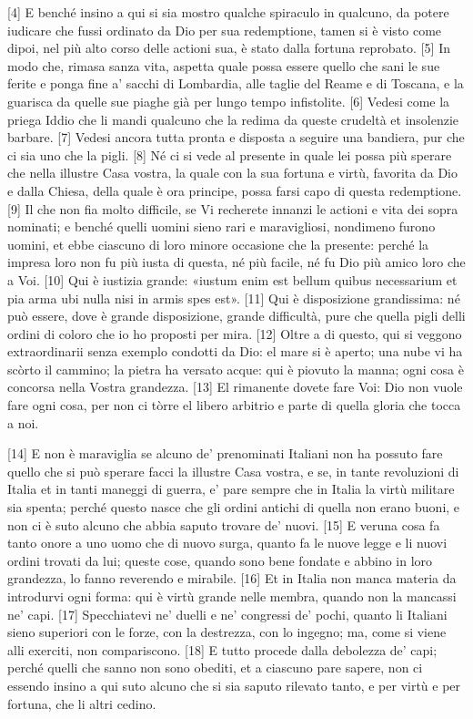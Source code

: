 {[}4{]} E benché insino a qui si sia mostro qualche spiraculo in
qualcuno, da potere iudicare che fussi ordinato da Dio per sua
redemptione, tamen si è visto come dipoi, nel più alto corso delle
actioni sua, è stato dalla fortuna reprobato. {[}5{]} In modo che,
rimasa sanza vita, aspetta quale possa essere quello che sani le sue
ferite e ponga fine a' sacchi di Lombardia, alle taglie del Reame e di
Toscana, e la guarisca da quelle sue piaghe già per lungo tempo
infistolite. {[}6{]} Vedesi come la priega Iddio che li mandi qualcuno
che la redima da queste crudeltà et insolenzie barbare. {[}7{]} Vedesi
ancora tutta pronta e disposta a seguire una bandiera, pur che ci sia
uno che la pigli. {[}8{]} Né ci si vede al presente in quale lei possa
più sperare che nella illustre Casa vostra, la quale con la sua fortuna
e virtù, favorita da Dio e dalla Chiesa, della quale è ora principe,
possa farsi capo di questa redemptione. {[}9{]} Il che non fia molto
difficile, se Vi recherete innanzi le actioni e vita dei sopra nominati;
e benché quelli uomini sieno rari e maravigliosi, nondimeno furono
uomini, et ebbe ciascuno di loro minore occasione che la presente:
perché la impresa loro non fu più iusta di questa, né più facile, né fu
Dio più amico loro che a Voi. {[}10{]} Qui è iustizia grande: «iustum
enim est bellum quibus necessarium et pia arma ubi nulla nisi in armis
spes est». {[}11{]} Qui è disposizione grandissima: né può essere, dove
è grande disposizione, grande difficultà, pure che quella pigli delli
ordini di coloro che io ho proposti per mira. {[}12{]} Oltre a di
questo, qui si veggono extraordinarii senza exemplo condotti da Dio: el
mare si è aperto; una nube vi ha scòrto il cammino; la pietra ha versato
acque: qui è piovuto la manna; ogni cosa è concorsa nella Vostra
grandezza. {[}13{]} El rimanente dovete fare Voi: Dio non vuole fare
ogni cosa, per non ci tòrre el libero arbitrio e parte di quella gloria
che tocca a noi.

{[}14{]} E non è maraviglia se alcuno de' prenominati Italiani non ha
possuto fare quello che si può sperare facci la illustre Casa vostra, e
se, in tante revoluzioni di Italia et in tanti maneggi di guerra, e'
pare sempre che in Italia la virtù militare sia spenta; perché questo
nasce che gli ordini antichi di quella non erano buoni, e non ci è suto
alcuno che abbia saputo trovare de' nuovi. {[}15{]} E veruna cosa fa
tanto onore a uno uomo che di nuovo surga, quanto fa le nuove legge e li
nuovi ordini trovati da lui; queste cose, quando sono bene fondate e
abbino in loro grandezza, lo fanno reverendo e mirabile. {[}16{]} Et in
Italia non manca materia da introdurvi ogni forma: qui è virtù grande
nelle membra, quando non la mancassi ne' capi. {[}17{]} Specchiatevi ne'
duelli e ne' congressi de' pochi, quanto li Italiani sieno superiori con
le forze, con la destrezza, con lo ingegno; ma, come si viene alli
exerciti, non compariscono. {[}18{]} E tutto procede dalla debolezza de'
capi; perché quelli che sanno non sono obediti, et a ciascuno pare
sapere, non ci essendo insino a qui suto alcuno che si sia saputo
rilevato tanto, e per virtù e per fortuna, che li altri cedino.


